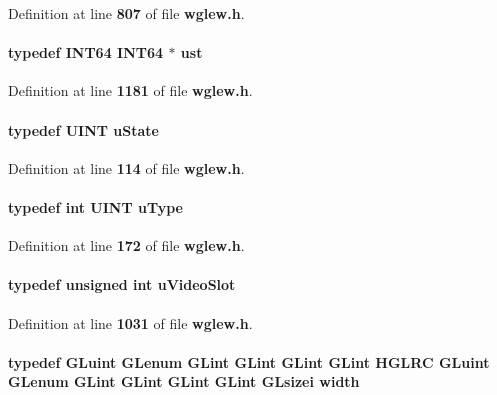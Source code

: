 Definition at line {\bf 807} of file {\bf wglew.\+h}.

\paragraph[{ust}]{\setlength{\rightskip}{0pt plus 5cm}typedef {\bf I\+N\+T64} {\bf I\+N\+T64} $\ast$ {\bf ust}}\label{wglew_8h_a0451014f70da85d839e8aaeedb261f0c}


Definition at line {\bf 1181} of file {\bf wglew.\+h}.

\paragraph[{u\+State}]{\setlength{\rightskip}{0pt plus 5cm}typedef {\bf U\+I\+NT} {\bf u\+State}}\label{wglew_8h_aef808945233c49c01fa533c44d4ff0bf}


Definition at line {\bf 114} of file {\bf wglew.\+h}.

\paragraph[{u\+Type}]{\setlength{\rightskip}{0pt plus 5cm}typedef {\bf int} {\bf U\+I\+NT} {\bf u\+Type}}\label{wglew_8h_aa04747ffb75c0cafda5e7d93061f2f64}


Definition at line {\bf 172} of file {\bf wglew.\+h}.

\paragraph[{u\+Video\+Slot}]{\setlength{\rightskip}{0pt plus 5cm}typedef unsigned {\bf int} {\bf u\+Video\+Slot}}\label{wglew_8h_a385c9039f8d1a2aaa7571a35a799bf07}


Definition at line {\bf 1031} of file {\bf wglew.\+h}.

\paragraph[{width}]{\setlength{\rightskip}{0pt plus 5cm}typedef {\bf G\+Luint} {\bf G\+Lenum} {\bf G\+Lint} {\bf G\+Lint} {\bf G\+Lint} {\bf G\+Lint} {\bf H\+G\+L\+RC} {\bf G\+Luint} {\bf G\+Lenum} {\bf G\+Lint} {\bf G\+Lint} {\bf G\+Lint} {\bf G\+Lint} {\bf G\+Lsizei} {\bf width}}\label{wglew_8h_aa105b18f96e6bc2485cb7f576a7fb9ba}


